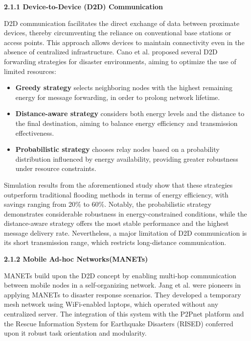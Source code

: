         \vspace{0.8em}
        \noindent\textbf{2.1.1 Device-to-Device (D2D) Communication}\par
        \vspace{0.3em}
            \sloppy D2D communication facilitates the direct exchange of data between proximate devices, thereby circumventing the reliance on conventional base stations or access points. This approach allows devices to maintain connectivity even in the absence of centralized infrastructure. Cano et al. proposed several D2D forwarding strategies for disaster environments, aiming to optimize the use of limited resources:
            \begin{itemize}
                \item \textbf{Greedy strategy} selects neighboring nodes with the highest remaining energy for message forwarding, in order to prolong network lifetime.
                \item \textbf{Distance-aware strategy} considers both energy levels and the distance to the final destination, aiming to balance energy efficiency and transmission effectiveness.
                \item \textbf{Probabilistic strategy} chooses relay nodes based on a probability distribution influenced by energy availability, providing greater robustness under resource constraints.
            \end{itemize}
            \vspace{0.4em}
            Simulation results from the aforementioned study show that these strategies outperform traditional flooding methods in terms of energy efficiency, with savings ranging from 20\% to 60\%. Notably, the probabilistic strategy demonstrates considerable robustness in energy-constrained conditions, while the distance-aware strategy offers the most stable performance and the highest message delivery rate. Nevertheless, a major limitation of D2D communication is its short transmission range, which restricts long-distance communication.

        \vspace{1em}
        \noindent\textbf{2.1.2 Mobile Ad-hoc Networks(MANETs)}\par
        \vspace{0.2em}
            MANETs build upon the D2D concept by enabling multi-hop communication between mobile nodes in a self-organizing network. Jang et al. were pioneers in applying MANETs to disaster response scenarios. They developed a temporary mesh network using WiFi-enabled laptops, which operated without any centralized server. The integration of this system with the P2Pnet platform and the Rescue Information System for Earthquake Disasters (RISED) conferred upon it robust task orientation and modularity.

